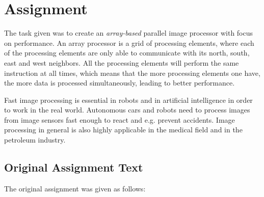 \section{Assignment}
The task given was to create an {\em array-based} parallel image processor with
focus on performance. An array processor is a grid of processing elements, where
each of the processing elements are only able to communicate with its north,
south, east and west neighbors. All the processing elements will perform the
same instruction at all times, which means that the more processing elements one
have, the more data is processed simultaneously, leading to better performance.

Fast image processing is essential in robots\cite{miller1989r-vision,
  thrun2007stanley} and in artificial intelligence\cite{hwang1989parallel} in
order to work in the real world. Autonomous cars and robots need to process
images from image sensors fast enough to react and e.g. prevent
accidents\cite{aufrere2003coll-avoid}. Image processing in general is also
highly applicable in the medical field\cite{luong2009medical-image,
  sternberg1983biomedical} and in the petroleum
industry\cite{ferrari2007steam-images}.

\subsection{Original Assignment Text}

The original assignment was given as follows:

